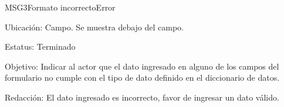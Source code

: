 \begin{mensaje}{MSG3}{Formato incorrecto}{Error}
    \item[Ubicación:] Campo. Se muestra debajo del campo.
    \item[Estatus:] Terminado
    \item[Objetivo:] Indicar al actor que el dato ingresado en alguno de los campos del formulario no cumple con el tipo de dato definido en el diccionario de datos.
    \item[Redacción:] El dato ingresado es incorrecto, favor de ingresar un dato válido.
\end{mensaje}


